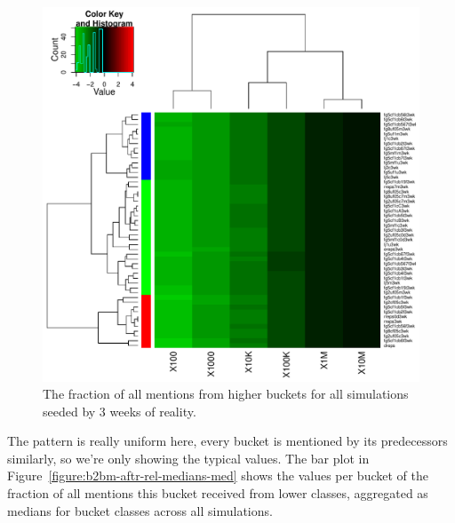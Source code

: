 \documentclass[10pt,oneside]{memoir}
\begin{document}
\begin{Spacing}{2}
\begin{figure}
\begin{center}
    \includegraphics{figures/crop/heatmap-b2bm-befr-rel-medians-log10-3wk}
    \caption{The fraction of all mentions from higher buckets for all simulations seeded by 3 weeks of reality.}
    \label{figure:heatmap-b2bm-befr-rel-medians-3wk}
\end{center}
\end{figure}
The pattern is really uniform here, every bucket is mentioned by its predecessors similarly, so we're only showing the typical values.  The bar plot in Figure~\ref{figure:b2bm-aftr-rel-medians-med} shows the values per bucket of the fraction of all mentions this bucket received from lower classes, aggregated as medians for bucket classes across all simulations.




\end{Spacing}
\end{document}
